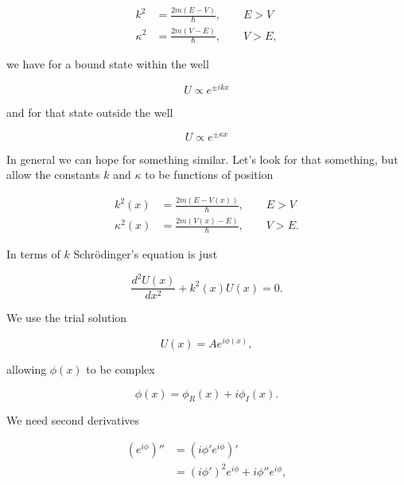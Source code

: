\begin{align}\label{eqn:qmTwoL12:90}
k^2 &= \frac{2m (E - V)}{\hbar},\qquad E > V \\
\kappa^2 &= \frac{2m (V - E)}{\hbar}, \qquad V > E,
\end{align}

we have for a bound state within the well

\begin{equation}\label{eqn:qmTwoL12:50}
U \propto e^{\pm i k x}
\end{equation}

and for that state outside the well

\begin{equation}\label{eqn:qmTwoL12:70}
U \propto e^{\pm \kappa x}
\end{equation}

In general we can hope for something similar.  Let's look for that something, but allow the constants $k$ and $\kappa$ to be functions of position

\begin{align}\label{eqn:qmTwoL12:110}
k^2(x) &= \frac{2m (E - V(x))}{\hbar},\qquad E > V \\
\kappa^2(x) &= \frac{2m (V(x) - E)}{\hbar}, \qquad V > E.
\end{align}

In terms of $k$ Schr\"{o}dinger's equation is just

\begin{equation}\label{eqn:qmTwoL12:130}
\frac{d^2 U(x)}{dx^2} + k^2(x) U(x) = 0.
\end{equation}

We use the trial solution 

\begin{equation}\label{eqn:qmTwoL12:150}
U(x) = A e^{i \phi(x)},
\end{equation}

allowing $\phi(x)$ to be complex

\begin{equation}\label{eqn:qmTwoL12:170}
\phi(x) = \phi_R(x) + i \phi_I(x).
\end{equation}

We need second derivatives

\begin{align*}
(e^{i \phi})'' 
&=
(i \phi' e^{i \phi})'  \\
&=
(i \phi')^2 e^{i \phi} + i \phi'' e^{i \phi},
\end{align*}

